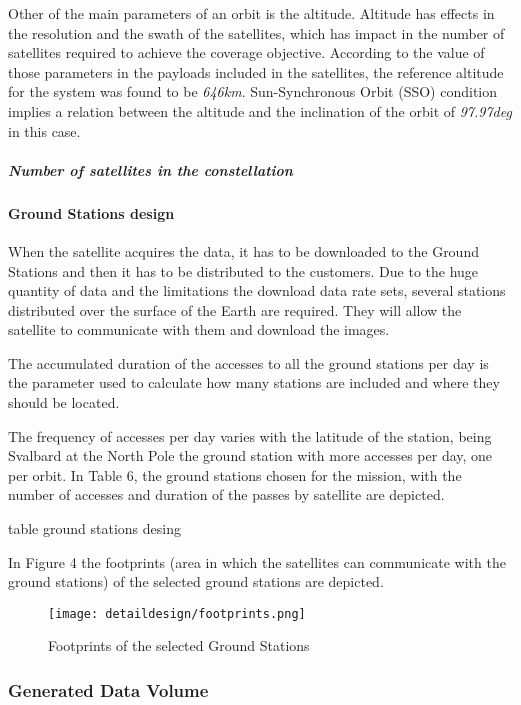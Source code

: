 Other of the main parameters of an orbit is the altitude. Altitude has effects in the resolution and the swath of the satellites, which has impact in the number of satellites required to achieve the coverage objective. According to the value of those parameters in the payloads included in the satellites, the reference altitude for the system was found to be \emph{646km}. Sun-Synchronous Orbit (SSO) condition implies a relation between the altitude and the inclination of the orbit of \emph{97.97deg} in this case.

\subparagraph{Number of satellites in the constellation}


\paragraph{Ground Stations design}

When the satellite acquires the data, it has to be downloaded to the Ground Stations and then it has to be distributed to the customers. Due to the huge quantity of data and the limitations the download data rate sets, several stations distributed over the surface of the Earth are required. They will allow the satellite to communicate with them and download the images. 

The accumulated duration of the accesses to all the ground stations per day is
the parameter used to calculate how many stations are included and where they
should be located. 

The frequency of accesses per day varies with the latitude of the station, being
Svalbard at the North Pole the ground station with more accesses per day, one
per orbit. In Table 6, the ground stations chosen for the mission, with the
number of accesses and duration of the passes by satellite are depicted.

table ground stations desing



In Figure 4 the footprints (area in which the satellites can communicate with the ground stations) of the selected ground stations are depicted.


\begin{figure}[!h]
\begin{center}
\texttt{[image: detaildesign/footprints.png]}
\caption{Footprints of the selected Ground Stations}
\label{fig:intr-footprints}
\end{center}
\end{figure}

\subsubsection{Generated Data Volume}

